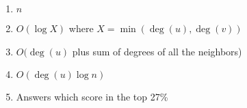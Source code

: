 \documentclass[11pt]{article}
\begin{document}
\begin{enumerate}
    \item $n$
    \item $O(\log{X})$ where $X = \min{(\deg(u), \deg(v))}$
    \item $O(\deg(u)$ plus sum of degrees of all the neighbors)
    \item $O(\deg(u) \log{n})$
    \item Answers which score in the top 27\%
\end{enumerate}
\end{document}

